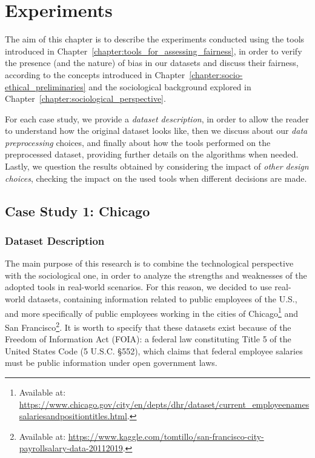 \chapter{Experiments}
\label{chapter:experiments}
\thispagestyle{empty}

The aim of this chapter is to describe the experiments conducted using the tools introduced in Chapter~\ref{chapter:tools_for_assessing_fairness}, in order to verify the presence (and the nature) of bias in our datasets and discuss their fairness, according to the concepts introduced in Chapter~\ref{chapter:socio-ethical_preliminaries} and the sociological background explored in Chapter~\ref{chapter:sociological_perspective}.

For each case study, we provide a \textit{dataset description}, in order to allow the reader to understand how the original dataset looks like, then we discuss about our \textit{data preprocessing} choices, and finally about how the tools performed on the preprocessed dataset, providing further details on the algorithms when needed. Lastly, we question the results obtained by considering the impact of \textit{other design choices}, checking the impact on the used tools when different decisions are made.


\section{Case Study 1: Chicago}
\subsection{Dataset Description}
The main purpose of this research is to combine the technological perspective with the sociological one, in order to analyze the strengths and weaknesses of the adopted tools in real-world scenarios. For this reason, we decided to use real-world datasets, containing information related to public employees of the U.S., and more specifically of public employees working in the cities of Chicago\footnote{Available at: \url{https://www.chicago.gov/city/en/depts/dhr/dataset/current_employeenamessalariesandpositiontitles.html}.} and San Francisco\footnote{Available at: \url{https://www.kaggle.com/tomtillo/san-francisco-city-payrollsalary-data-20112019}.}. It is worth to specify that these datasets exist because of the Freedom of Information Act (FOIA): a federal law constituting Title 5 of the United States Code (5 U.S.C. \S 552), which claims that federal employee salaries must be public information under open government laws.

